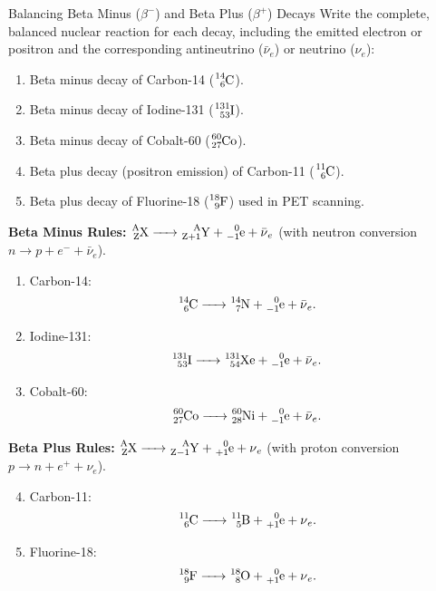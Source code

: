 \begin{exercise}{Balancing Beta Minus ($\beta^-$) and Beta Plus ($\beta^+$) Decays}
Write the complete, balanced nuclear reaction for each decay, including the emitted electron or positron and the corresponding antineutrino ($\bar{\nu}_e$) or neutrino ($\nu_e$):
\begin{enumerate}[leftmargin=1.5em,itemsep=2pt]
  \item Beta minus decay of Carbon-14 ($\ce{^{14}_{6}C}$).
  \item Beta minus decay of Iodine-131 ($\ce{^{131}_{53}I}$).
  \item Beta minus decay of Cobalt-60 ($\ce{^{60}_{27}Co}$).
  \item Beta plus decay (positron emission) of Carbon-11 ($\ce{^{11}_{6}C}$).
  \item Beta plus decay of Fluorine-18 ($\ce{^{18}_{9}F}$) used in PET scanning.
\end{enumerate}
\end{exercise}

\begin{tabletworkspace}[5.0cm]
\end{tabletworkspace}

\begin{solution}
\textbf{Beta Minus Rules:} $\ce{^{A}_{Z}X -> ^{A}_{Z+1}Y + ^{0}_{-1}e + \bar{\nu}_e}$ (with neutron conversion $n \to p + e^- + \bar{\nu}_e$).
\begin{enumerate}[leftmargin=1.5em,itemsep=2pt]
  \item Carbon-14:
  \[
  \ce{^{14}_{6}C -> ^{14}_{7}N + ^{0}_{-1}e + \bar{\nu}_e}.
  \]
  \item Iodine-131:
  \[
  \ce{^{131}_{53}I -> ^{131}_{54}Xe + ^{0}_{-1}e + \bar{\nu}_e}.
  \]
  \item Cobalt-60:
  \[
  \ce{^{60}_{27}Co -> ^{60}_{28}Ni + ^{0}_{-1}e + \bar{\nu}_e}.
  \]
\end{enumerate}

\textbf{Beta Plus Rules:} $\ce{^{A}_{Z}X -> ^{A}_{Z-1}Y + ^{0}_{+1}e + \nu_e}$ (with proton conversion $p \to n + e^+ + \nu_e$).
\begin{enumerate}[leftmargin=1.5em,itemsep=2pt]
  \setcounter{enumi}{3}
  \item Carbon-11:
  \[
  \ce{^{11}_{6}C -> ^{11}_{5}B + ^{0}_{+1}e + \nu_e}.
  \]
  \item Fluorine-18:
  \[
  \ce{^{18}_{9}F -> ^{18}_{8}O + ^{0}_{+1}e + \nu_e}.
  \]
\end{enumerate}
\end{solution}

